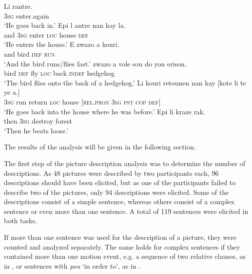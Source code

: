 \documentclass[output=paper,colorlinks,citecolor=brown]{langscibook}
\begin{document}
\ea\label{ex:3:21}
\gll Li rantre.\\
     \textsc{3sg} enter.again \\
\glt ‘He goes back in.’
\ex \label{ex:3:22}
\gll Epi l antre nan kay la. \\
and \textsc{3sg} enter \textsc{loc} house \textsc{def} \\
\glt ‘He enters the house.’
\ex E zwazo a kouri. \\\label{ex:3:23}
    and bird \textsc{def} \textsc{run} \\
\glt ‘And the bird runs/flies fast.’
\ex \label{ex:3:24}
 zwazo a vole sou do yon erison.\\
     {} bird \textsc{def} fly \textsc{loc} back \textsc{indef} hedgehog \\
\glt ‘The bird flies onto the back of a hedgehog.’
\ex \label{ex:3:25}
   \gll Li kouri retounen nan kay {[}kote li te ye a.{]}\\
    \textsc{3sg} run return \textsc{loc} house {[}\textsc{rel.pron} \textsc{3sg} \textsc{pst} \textsc{cop} \textsc{def}{]} \\
\glt `He goes back into the house where he was before.'
\ex \label{ex:3:26}
\gll Epi li kraze rak.\\
     then \textsc{3sg} destroy forest \\
\glt ‘Then he beats loose.’
\z

The results of the analysis will be given in the following section.

The first step of the picture description analysis was to determine the number of descriptions. As 48 pictures were described by two participants each, 96 descriptions should have been elicited, but as one of the participants failed to describe two of the pictures, only 94 descriptions were elicited. Some of the descriptions consist of a simple sentence, whereas others consist of a complex sentence or even more than one sentence. A total of 119 sentences were elicited in both tasks.

If more than one sentence was used for the description of a picture, they were counted and analyzed separately. The same holds for complex sentences if they contained more than one motion event, e.g. a sequence of two relative clauses, as in , or sentences with \emph{pou} `in order to', as in  .
\end{document}
